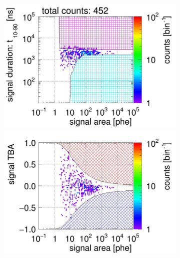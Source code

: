 \begin{landscape}
\begin{figure}[!p]
\begin{subfigure}[t]{0.33\textwidth}
			\caption{}
			\label{fig:signal selection dv 10 03}
		\end{subfigure}
		\begin{subfigure}[t]{0.33\textwidth}
			\centering
			\includegraphics[width=\figurewidth,clip,trim={0 98 0 0}]{Figures/GasTest/CutsValid/res64766/pdpa29Vecfig64766.jpg}
			\includegraphics[width=\figurewidth,clip,trim={0 98 0 40}]{Figures/GasTest/CutsValid/res64766/tbapa29Vecfig64766.jpg}

\end{subfigure}
\end{figure}
\end{landscape}

